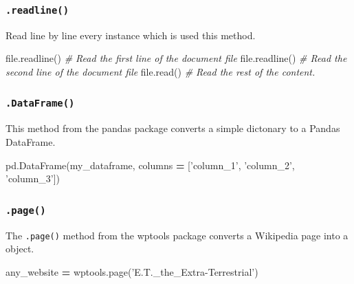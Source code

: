 \documentclass[]{book}
\newenvironment{Shaded}{\begin{snugshade}}{\end{snugshade}}
\newcommand{\StringTok}[1]{\textcolor[rgb]{0.31,0.60,0.02}{#1}}
\newcommand{\CommentTok}[1]{\textcolor[rgb]{0.56,0.35,0.01}{\textit{#1}}}
\newcommand{\OperatorTok}[1]{\textcolor[rgb]{0.81,0.36,0.00}{\textbf{#1}}}
\newcommand{\BuiltInTok}[1]{#1}
\newcommand{\NormalTok}[1]{#1}
\begin{document}
\subsubsection{\texorpdfstring{\texttt{.readline()}}{.readline()}}\label{readline}

Read line by line every instance which is used this method.

\begin{Shaded}
\begin{Highlighting}[]
\BuiltInTok{file}\NormalTok{.readline() }\CommentTok{# Read the first line of the document file}
\BuiltInTok{file}\NormalTok{.readline() }\CommentTok{# Read the second line of the document file}
\BuiltInTok{file}\NormalTok{.read()     }\CommentTok{# Read the rest of the content.}
\end{Highlighting}
\end{Shaded}

\subsubsection{\texorpdfstring{\texttt{.DataFrame()}}{.DataFrame()}}\label{dataframe}

This method from the pandas package converts a simple dictonary to a
Pandas DataFrame.

\begin{Shaded}
\begin{Highlighting}[]
\NormalTok{pd.DataFrame(my_dataframe, columns }\OperatorTok{=}\NormalTok{ [}\StringTok{'column_1'}\NormalTok{, }\StringTok{'column_2'}\NormalTok{, }\StringTok{'column_3'}\NormalTok{])}
\end{Highlighting}
\end{Shaded}

\subsubsection{\texorpdfstring{\texttt{.page()}}{.page()}}\label{page}

The \texttt{.page()} method from the wptools package converts a
Wikipedia page into a object.

\begin{Shaded}
\begin{Highlighting}[]
\NormalTok{any_website }\OperatorTok{=}\NormalTok{ wptools.page(}\StringTok{'E.T._the_Extra-Terrestrial'}\NormalTok{)}
\end{Highlighting}
\end{Shaded}
\end{document}

